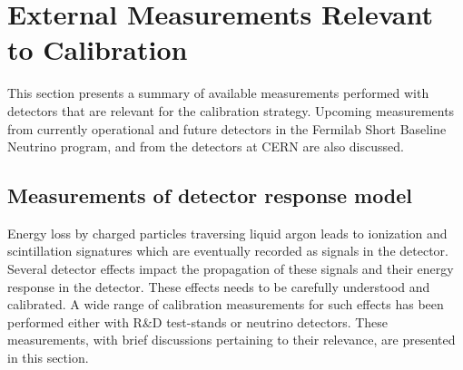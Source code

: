 \section{External Measurements Relevant to Calibration }\label{sec:extcalib}
This section presents a summary of available measurements performed with  detectors that are relevant for the  calibration strategy. Upcoming measurements from currently operational and future detectors in the Fermilab Short Baseline Neutrino program, and from the  detectors %
at CERN are also discussed. 

\subsection{Measurements of detector response model}
Energy loss by charged particles traversing liquid argon leads to ionization and scintillation signatures which are eventually recorded as signals in the detector. Several detector effects impact the propagation of these signals and their energy response in the detector. These effects needs to be carefully understood and calibrated. A wide range of calibration measurements for such effects has been performed either with R\&D test-stands or neutrino detectors. These measurements, with brief discussions pertaining to their relevance, are presented in this section.


